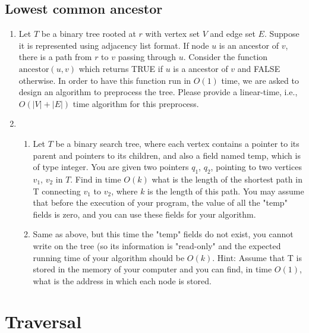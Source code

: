 \subsection{Lowest common ancestor}
\begin{Exercise}
\begin{enumerate}
\item Let $T$ be a binary tree rooted at $r$ with vertex set $V$ and edge set $E$. Suppose it is represented using adjacency list format. If node $u$ is an ancestor of $v$, there is a path from $r$ to $v$ passing through $u$. Consider the function $\text{ancestor}(u, v)$ which returns TRUE if $u$ is a ancestor of $v$ and FALSE otherwise. In order to have this function run in $O(1)$ time, we are asked to design an algorithm to preprocess the tree. Please provide a linear-time, i.e., $O(|V| + |E|)$ time algorithm for this preprocess. 
\item \begin{enumerate}
\item Let $T$ be a binary search tree, where each vertex contains a pointer to its parent and pointers to its children, and also a field named temp, which is of type integer. You are given two pointers $q_1$, $q_2$, pointing to two vertices $v_1$, $v_2$ in $T$. Find in time $O(k)$ what is the length of the shortest path in T connecting $v_1$ to $v_2$, where $k$ is the length of this path. You may assume that before the execution of your program, the value of all the "temp" fields is zero, and you can use these fields for your algorithm.
\item Same as above, but this time the "temp" fields do not exist, you cannot write on the tree (so its information is "read-only" and the expected running time of your algorithm should be $O(k)$.
Hint: Assume that T is stored in the memory of your computer and you can find, in time $O(1)$, what is the address in which each node is stored. 
\end{enumerate}
\end{enumerate}
\end{Exercise}
\begin{Answer}
\end{Answer}

\section{Traversal}
